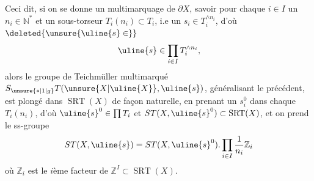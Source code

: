 
Ceci dit, si on se donne un
multimarquage de $\partial X$, savoir pour
chaque $i\in I$ un $n_i\in\mathbb N^*$ et un
sous-torseur
$T_i(n_i)\subset T_i$,
 i.e
un $s_i\in T_i^{\wedge n_i}$, d'où
$\deleted{\unsure{\uline{s}\in}}$
\[
\uline{s}\in\prod_{i\in I}T_i^{\wedge n_i},
\]
alors le groupe de Teichmüller multimarqué
$S_{\unsure{*|1|g}}T(\unsure{X|\uline{X}},\uline{s})$,
généralisant le précédent, est
plongé dans $\operatorname{SRT}(X)$ de façon naturelle,
en prenant un $s_i^0$ dans chaque $T_i(n_i)$, d'où
$\uline{s}^0\in\prod T_i$ et
$ST(X,\uline{s}^0)\subset\operatorname{SRT}(X)$,
et on prend le ss-groupe
\[
ST(X,\uline{s})=ST(X,\uline{s}^0).
\prod_{i\in I}\frac1{n_i}\mathbb Z_i
\]
où $\mathbb Z_i$ est le $i$ème facteur de
$\mathbb Z^I\subset\operatorname{SRT}(X)$.



